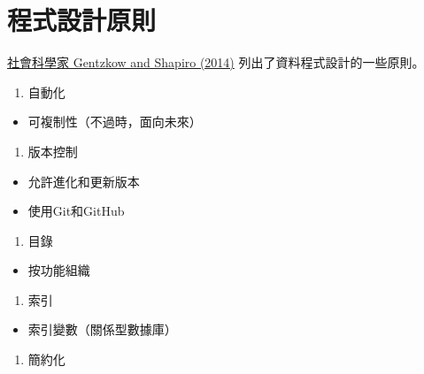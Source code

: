 \documentclass[]{book}
\providecommand{\tightlist}{%
  \setlength{\itemsep}{0pt}\setlength{\parskip}{0pt}}
\begin{document}
\hypertarget{section-1}{%
\section{程式設計原則}\label{section-1}}

\href{http://home.bi.no/charlotte.ostergaard/students/CodeAndData.pdf}{社會科學家 Gentzkow and Shapiro (2014)} 列出了資料程式設計的一些原則。

\begin{enumerate}
\def\labelenumi{\arabic{enumi}.}
\tightlist
\item
  自動化
\end{enumerate}

\begin{itemize}
\tightlist
\item
  可複制性（不過時，面向未來）
\end{itemize}

\begin{enumerate}
\def\labelenumi{\arabic{enumi}.}
\setcounter{enumi}{1}
\tightlist
\item
  版本控制
\end{enumerate}

\begin{itemize}
\tightlist
\item
  允許進化和更新版本
\item
  使用Git和GitHub
\end{itemize}

\begin{enumerate}
\def\labelenumi{\arabic{enumi}.}
\setcounter{enumi}{2}
\tightlist
\item
  目錄
\end{enumerate}

\begin{itemize}
\tightlist
\item
  按功能組織
\end{itemize}

\begin{enumerate}
\def\labelenumi{\arabic{enumi}.}
\setcounter{enumi}{3}
\tightlist
\item
  索引
\end{enumerate}

\begin{itemize}
\tightlist
\item
  索引變數（關係型數據庫）
\end{itemize}

\begin{enumerate}
\def\labelenumi{\arabic{enumi}.}
\setcounter{enumi}{4}
\tightlist
\item
  簡約化
\end{enumerate}
\end{document}
